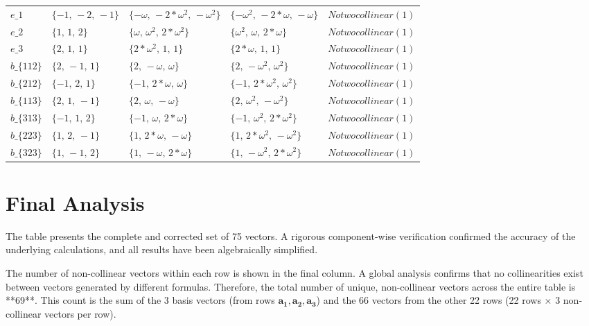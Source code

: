 \documentclass[pra,twocolumn,nofootinbib]{revtex4-2}
\begin{document}
\begin{tabular}{l l l l l}
$e\_1$ & $\{-1,\,-2,\,-1\}$ & $\{-\omega,\,-2*\omega^2,\,-\omega^2\}$ & $\{-\omega^2,\,-2*\omega,\,-\omega\}$ & $No two collinear (1)$ \\
$e\_2$ & $\{1,\,1,\,2\}$ & $\{\omega,\,\omega^2,\,2*\omega^2\}$ & $\{\omega^2,\,\omega,\,2*\omega\}$ & $No two collinear (1)$ \\
$e\_3$ & $\{2,\,1,\,1\}$ & $\{2*\omega^2,\,1,\,1\}$ & $\{2*\omega,\,1,\,1\}$ & $No two collinear (1)$ \\
$b\_\{112\}$ & $\{2,\,-1,\,1\}$ & $\{2,\,-\omega,\,\omega\}$ & $\{2,\,-\omega^2,\,\omega^2\}$ & $No two collinear (1)$ \\
$b\_\{212\}$ & $\{-1,\,2,\,1\}$ & $\{-1,\,2*\omega,\,\omega\}$ & $\{-1,\,2*\omega^2,\,\omega^2\}$ & $No two collinear (1)$ \\
$b\_\{113\}$ & $\{2,\,1,\,-1\}$ & $\{2,\,\omega,\,-\omega\}$ & $\{2,\,\omega^2,\,-\omega^2\}$ & $No two collinear (1)$ \\
$b\_\{313\}$ & $\{-1,\,1,\,2\}$ & $\{-1,\,\omega,\,2*\omega\}$ & $\{-1,\,\omega^2,\,2*\omega^2\}$ & $No two collinear (1)$ \\
$b\_\{223\}$ & $\{1,\,2,\,-1\}$ & $\{1,\,2*\omega,\,-\omega\}$ & $\{1,\,2*\omega^2,\,-\omega^2\}$ & $No two collinear (1)$ \\
$b\_\{323\}$ & $\{1,\,-1,\,2\}$ & $\{1,\,-\omega,\,2*\omega\}$ & $\{1,\,-\omega^2,\,2*\omega^2\}$ & $No two collinear (1)$ \\
\end{tabular}

\newpage
\twocolumngrid %

\section*{Final Analysis}
The table presents the complete and corrected set of 75 vectors. A rigorous component-wise verification confirmed the accuracy of the underlying calculations, and all results have been algebraically simplified.

The number of non-collinear vectors within each row is shown in the final column. A global analysis confirms that no collinearities exist between vectors generated by different formulas. Therefore, the total number of unique, non-collinear vectors across the entire table is **69**. This count is the sum of the 3 basis vectors (from rows $\mathbf{a_1}, \mathbf{a_2}, \mathbf{a_3}$) and the 66 vectors from the other 22 rows (22 rows $\times$ 3 non-collinear vectors per row).
\end{document}
